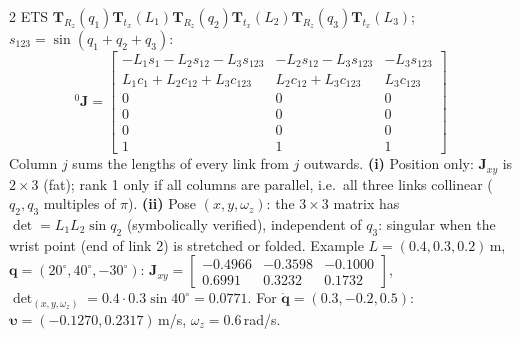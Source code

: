 \begin{multicols}{2}
ETS $\mathbf T_{R_z}(q_1)\mathbf T_{t_x}(L_1)\mathbf T_{R_z}(q_2)\mathbf T_{t_x}(L_2)\mathbf T_{R_z}(q_3)\mathbf T_{t_x}(L_3)$; $s_{123}=\sin(q_1{+}q_2{+}q_3)$:
\[{}^0\mathbf J=\begin{bmatrix}-L_1s_1-L_2s_{12}-L_3s_{123}&-L_2s_{12}-L_3s_{123}&-L_3s_{123}\\L_1c_1+L_2c_{12}+L_3c_{123}&L_2c_{12}+L_3c_{123}&L_3c_{123}\\0&0&0\\0&0&0\\0&0&0\\1&1&1\end{bmatrix}\]
Column $j$ sums the lengths of every link from $j$ outwards. \textbf{(i)} Position only: $\mathbf J_{xy}$ is $2\times3$ (fat); rank 1 only if all columns are parallel, i.e.\ all three links collinear ($q_2,q_3$ multiples of $\pi$). \textbf{(ii)} Pose $(x,y,\omega_z)$: the $3\times3$ matrix has $\det=L_1L_2\sin q_2$ (symbolically verified), independent of $q_3$: singular when the wrist point (end of link 2) is stretched or folded. Example $L=(0.4,0.3,0.2)$\,m, $\mathbf q=(20^\circ,40^\circ,-30^\circ)$: $\mathbf J_{xy}=\begin{bmatrix}-0.4966&-0.3598&-0.1000\\0.6991&0.3232&0.1732\end{bmatrix}$, $\det_{(x,y,\omega_z)}=0.4\cdot0.3\sin40^\circ=0.0771$. For $\dot{\mathbf q}=(0.3,-0.2,0.5)$: $\boldsymbol\upsilon=(-0.1270,0.2317)$\,m/s, $\omega_z=0.6$\,rad/s. \chk
\begin{center}
\\
\end{center}

\end{multicols}
